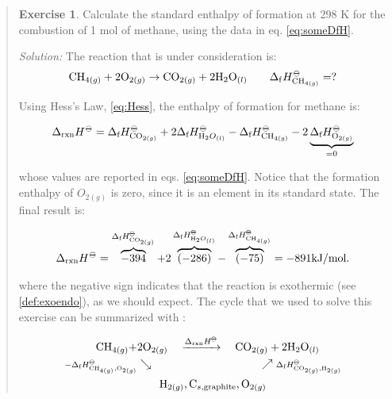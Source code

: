 \documentclass[
  9pt,
]{extbook}
\theoremstyle{definition}
\theoremstyle{definition}
\theoremstyle{definition}
\newtheorem{exercise}{Exercise}[chapter]
\theoremstyle{remark}
\begin{document}
\begin{quote}
\begin{exercise}
\protect\hypertarget{exr:HessLawEx}{}{\label{exr:HessLawEx} }Calculate the standard enthalpy of formation at 298 K for the combustion of 1 mol of methane, using the data in eq. \eqref{eq:someDfH}.

\emph{Solution:} The reaction that is under consideration is:
\begin{equation}
  \mathrm{CH}_{4(g)} + 2 \mathrm{O}_{2(g)} \rightarrow \mathrm{CO}_{2(g)} + 2 \mathrm{H}_2 \mathrm{O}_{(l)} \qquad \Delta_{\mathrm{f}} H_{\mathrm{CH}_{4(g)}}^{-\kern-6pt{\ominus}\kern-6pt-}= ?
\end{equation}

Using Hess's Law, \eqref{eq:Hess}, the enthalpy of formation for methane is:

\begin{equation}
 \Delta_{\text{rxn}} H^{-\kern-6pt{\ominus}\kern-6pt-}=  \Delta_{\text{f}} H^{-\kern-6pt{\ominus}\kern-6pt-}_{\mathrm{CO}_{2(g)}} + 2 \Delta_{\text{f}} H^{-\kern-6pt{\ominus}\kern-6pt-}_{\mathrm{H}_{2}O_{(l)}} - \Delta_{\text{f}} H^{-\kern-6pt{\ominus}\kern-6pt-}_{\mathrm{CH}_{4(g)}} - 2 \underbrace{\Delta_{\text{f}} H^{-\kern-6pt{\ominus}\kern-6pt-}_{\mathrm{O}_{2(g)}}}_{=0}
\end{equation}

whose values are reported in eqs. \eqref{eq:someDfH}. Notice that the formation enthalpy of \(O_{2(g)}\) is zero, since it is an element in its standard state. The final result is:

\begin{equation}
 \Delta_{\text{rxn}} H^{-\kern-6pt{\ominus}\kern-6pt-}=  \overbrace{-394}^{\Delta_{\text{f}} H^{-\kern-6pt{\ominus}\kern-6pt-}_{\mathrm{CO}_{2(g)}}} +2 \overbrace{(-286)}^{\Delta_{\text{f}} H^{-\kern-6pt{\ominus}\kern-6pt-}_{\mathrm{H}_{2}O_{(l)}}} - \overbrace{(-75)}^{\Delta_{\text{f}} H^{-\kern-6pt{\ominus}\kern-6pt-}_{\mathrm{CH}_{4(g)}}}  = -891 \mathrm{kJ/mol}.
\end{equation}

where the negative sign indicates that the reaction is exothermic (see \ref{def:exoendo}), as we should expect. The cycle that we used to solve this exercise can be summarized with :

\begin{equation}
\begin{aligned}
\mathrm{CH}_{4(g)} + & 2 \mathrm{O}_{2(g)} \quad \xrightarrow{\Delta_{\text{rxn}} H^{-\kern-6pt{\ominus}\kern-6pt-}} \quad \mathrm{CO}_{2(g)} + 2 \mathrm{H}_2 \mathrm{O}_{(l)} \\
  \scriptstyle{-\Delta_{\text{f}} H_{\mathrm{CH}_{4(g)},\mathrm{O}_{2(g)}}^{-\kern-6pt{\ominus}\kern-6pt-}} & \searrow \qquad \qquad \qquad \qquad \qquad \nearrow \; \scriptstyle{\Delta_{\text{f}} H_{\text{CO}_{2(g)},\mathrm{H}_{2(g)}}^{-\kern-6pt{\ominus}\kern-6pt-}}\\
  & \qquad \mathrm{H}_{2(g)}, \mathrm{C}_{s,\text{graphite}}, \mathrm{O}_{2(g)}
\end{aligned}
\end{equation}


\end{exercise}
\end{quote}
\end{document}
